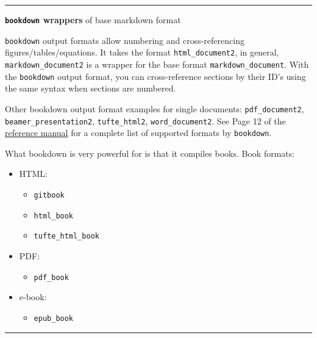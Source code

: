 \documentclass[
  a4paper,
  twoside,
  openright]{book}
\providecommand{\tightlist}{%
  \setlength{\itemsep}{0pt}\setlength{\parskip}{0pt}}
\theoremstyle{definition}
\theoremstyle{definition}
\theoremstyle{definition}
\theoremstyle{definition}
\theoremstyle{remark}
\begin{document}
\begin{center}\rule{0.5\linewidth}{0.5pt}\end{center}

\textbf{\texttt{bookdown} wrappers} of base markdown format

{\texttt{bookdown} output formats} allow numbering and cross-referencing figures/tables/equations. It takes the format \texttt{html\_document2}, in general, \texttt{markdown\_document2} is a wrapper for the base format \texttt{markdown\_document}. With the \texttt{bookdown} output format, you can cross-reference sections by their ID's using the same syntax when sections are numbered.

Other bookdown output format examples for single documents: \texttt{pdf\_document2}, \texttt{beamer\_presentation2}, \texttt{tufte\_html2}, \texttt{word\_document2}. See Page 12 of the \href{https://cran.r-project.org/web/packages/bookdown/bookdown.pdf}{reference manual} for a complete list of supported formats by \texttt{bookdown}.

What bookdown is very powerful for is that it compiles books. Book formats:

\begin{itemize}
\tightlist
\item
  HTML:

  \begin{itemize}
  \tightlist
  \item
    \texttt{gitbook}
  \item
    \texttt{html\_book}
  \item
    \texttt{tufte\_html\_book}
  \end{itemize}
\item
  PDF:

  \begin{itemize}
  \tightlist
  \item
    \texttt{pdf\_book}
  \end{itemize}
\item
  e-book:

  \begin{itemize}
  \tightlist
  \item
    \texttt{epub\_book}
  \end{itemize}
\end{itemize}

\begin{center}\rule{0.5\linewidth}{0.5pt}\end{center}
\end{document}
